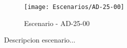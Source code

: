 \begin{figure}[H]
\centering
\texttt{[image: Escenarios/AD-25-00]}
\caption{Escenario - AD-25-00}
\label{fig:AD-25-00}
\end{figure}

Descripcion escenario...
\clearpage
